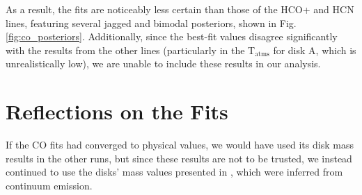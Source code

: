 




As a result, the fits are noticeably less certain than those of the HCO+ and HCN lines, featuring several jagged and bimodal posteriors, shown in Fig.\ref{fig:co_posteriors}. Additionally, since the best-fit values disagree significantly with the results from the other lines (particularly in the T$_\text{atms}$ for disk A, which is unrealistically low), we are unable to include these results in our analysis.







\section{Reflections on the Fits}

If the CO fits had converged to physical values, we would have used its disk mass results in the other runs, but since these results are not to be trusted, we instead continued to use the disks' mass values presented in \citet{Williams2014}, which were inferred from continuum emission.

